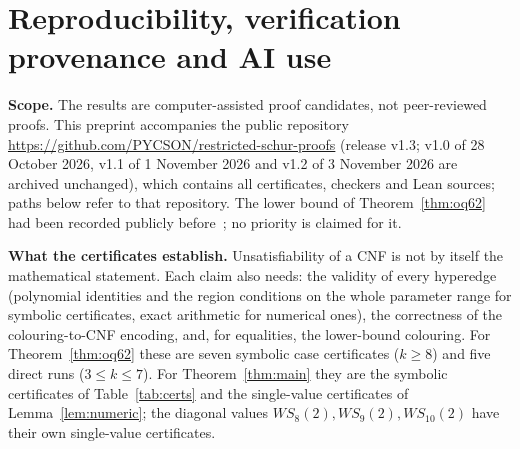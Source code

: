 \documentclass[11pt]{amsart}
\theoremstyle{definition}
\begin{document}
\appendix
\section{Reproducibility, verification provenance and AI use}\label{app:repro-ai}



\smallskip\noindent\textbf{Scope.} The results are computer-assisted proof candidates, not peer-reviewed proofs. This preprint accompanies the public repository \url{https://github.com/PYCSON/restricted-schur-proofs} (release v1.3; v1.0 of 28 October 2026, v1.1 of 1 November 2026 and v1.2 of 3 November 2026 are archived unchanged), which contains all certificates, checkers and Lean sources; paths below refer to that repository. The lower bound of Theorem~\ref{thm:oq62} had been recorded publicly before~\cite{omega}; no priority is claimed for it.


\smallskip\noindent\textbf{What the certificates establish.} Unsatisfiability of a CNF is not by itself the mathematical statement. Each claim also needs: the validity of every hyperedge (polynomial identities and the region conditions on the whole parameter range for symbolic certificates, exact arithmetic for numerical ones), the correctness of the colouring-to-CNF encoding, and, for equalities, the lower-bound colouring. For Theorem~\ref{thm:oq62} these are seven symbolic case certificates ($k\ge8$) and five direct runs ($3\le k\le7$). For Theorem~\ref{thm:main} they are the symbolic certificates of Table~\ref{tab:certs} and the single-value certificates of Lemma~\ref{lem:numeric}; the diagonal values $WS_8(2),WS_9(2),WS_{10}(2)$ have their own single-value certificates.
\end{document}
